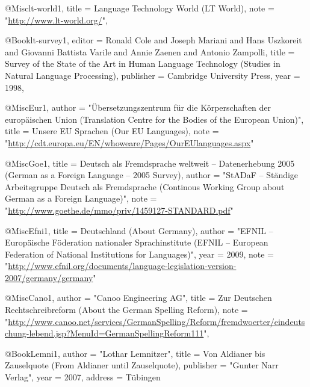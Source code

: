 @Misc{lt-world1,
  title = 	 {{Language Technology World (LT World)}},
  note =
                  "\url{http://www.lt-world.org/}",
}



@Book{lt-survey1,
  editor = 	 {Ronald Cole and Joseph Mariani and Hans Uszkoreit and Giovanni Battista Varile and Annie Zaenen and Antonio Zampolli},
  title = 	 {{Survey of the State of the Art in Human Language Technology (Studies in Natural Language Processing)}},
  publisher = 	 {Cambridge University Press},
  year = 	 {1998},
}













@Misc{Eur1,
  author =	 "Übersetzungszentrum für die Körperschaften der
                  europäischen Union (Translation Centre for the
                  Bodies of the European Union)",
  title =	 {{Unsere EU Sprachen (Our EU Languages)}},
  note =
                  "\url{http://cdt.europa.eu/EN/whoweare/Pages/OurEUlanguages.aspx}"
}

@Misc{Goe1,
  title =	 {{Deutsch als Fremdsprache weltweit -- Datenerhebung
                  2005 (German as a Foreign Language -- 2005 Survey)}},
  author =	 "StADaF -- St{\"a}ndige Arbeitsgruppe Deutsch als
                  Fremdsprache (Continous Working Group about German
                  as a Foreign Language)",
  note =
                  "\url{http://www.goethe.de/mmo/priv/1459127-STANDARD.pdf}"
}

@Misc{Efni1,
  title =	 {{Deutschland (About Germany)}},
  author =	 "EFNIL -- Europäische Föderation nationaler
                  Sprachinstitute (EFNIL -- European Federation of
                  National Institutions for Languages)",
  year =	 2009,
  note =
                  "\url{http://www.efnil.org/documents/language-legislation-version-2007/germany/germany}"
}

@Misc{Cano1,
  author =	 "Canoo Engineering AG",
  title =	 {{Zur Deutschen Rechtschreibreform (About the German
                  Spelling Reform)}},
  note =
                  "\url{http://www.canoo.net/services/GermanSpelling/Reform/fremdwoerter/eindeutschung-lebend.jsp?MenuId=GermanSpellingReform111}",
}

@Book{Lemni1,
  author =	 "Lothar Lemnitzer",
  title =	 {{Von Aldianer bis Zauselquote (From Aldianer until
                  Zauselquote)}},
  publisher =	 "Gunter Narr Verlag",
  year =	 2007,
  address =	 {T{\"u}bingen}
}

